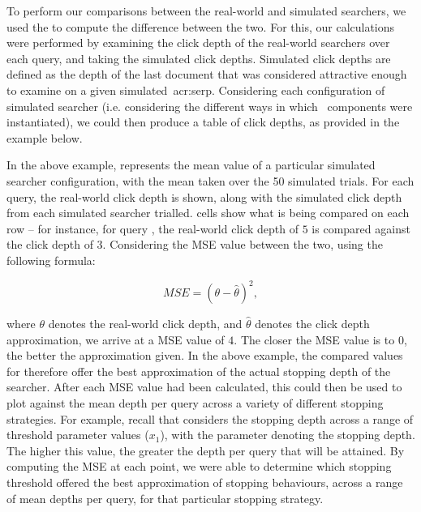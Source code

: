 To perform our comparisons between the real-world and simulated searchers, we used the  to compute the difference between the two. For this, our calculations were performed by examining the click depth of the real-world searchers over each query, and taking the simulated click depths. Simulated click depths are defined as the depth of the last document that was considered attractive enough to examine on a given simulated~\gls{acr:serp}. Considering each configuration of simulated searcher (i.e. considering the different ways in which \simiir~components were instantiated), we could then produce a table of click depths, as provided in the example below.

\begin{figure}[h]
    \centering
    \vspace*{-8mm}
\end{figure}

In the above example,  represents the mean value of a particular simulated searcher configuration, with the mean taken over the 50 simulated trials. For each query, the real-world click depth is shown, along with the simulated click depth from each simulated searcher trialled.  cells show what is being compared on each row -- for instance, for query , the real-world click depth of $5$ is compared against the  click depth of $3$. Considering the MSE value between the two, using the following formula:

\vspace*{-4mm}
\begin{equation}
MSE = (\theta - \hat{\theta})^{2},
\end{equation}

where $\theta$ denotes the real-world click depth, and $\hat{\theta}$ denotes the click depth approximation, we arrive at a MSE value of $4$. The closer the MSE value is to $0$, the better the approximation given. In the above example, the compared values for  therefore offer the best approximation of the actual stopping depth of the searcher. After each MSE value had been calculated, this could then be used to plot against the mean depth per query across a variety of different stopping strategies. For example, recall that  considers the stopping depth across a range of threshold parameter values ($x_1$), with the parameter denoting the stopping depth. The higher this value, the greater the depth per query that will be attained. By computing the MSE at each point, we were able to determine which stopping threshold offered the best approximation of stopping behaviours, across a range of mean depths per query, for that particular stopping strategy.

